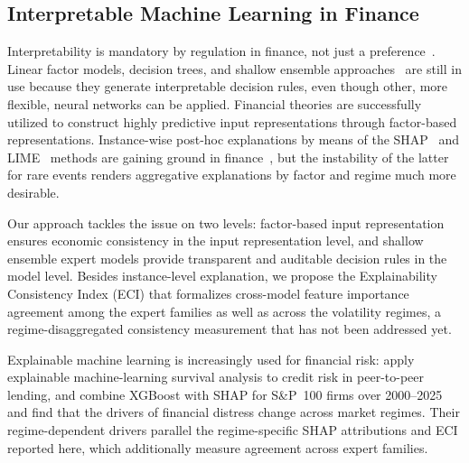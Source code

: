 \documentclass[]{interact}
\begin{document}
\subsection{Interpretable Machine Learning in Finance}
\label{subsec:rel_interpretable}

Interpretability is mandatory by regulation in finance, not just a
preference~\citep{arrieta2020explainable}. Linear factor models, decision trees, and
shallow ensemble approaches~\citep{breiman2001random, friedman2001greedy} are still in use because
they generate interpretable decision rules, even though other,
more flexible, neural networks can be applied. Financial theories
are successfully utilized to construct highly predictive input representations through factor-based representations. Instance-wise post-hoc explanations by means of the SHAP~\citep{lundberg2017shap}
and LIME~\citep{ribeiro2016lime} methods are gaining ground in finance~\citep{wang2024adapt},
but the instability of the latter for rare events renders aggregative explanations by factor and regime much more desirable.

Our approach tackles the issue on two levels: factor-based
input representation ensures economic consistency in the input
representation level, and shallow ensemble expert models provide transparent and auditable decision rules in the model
level. Besides instance-level explanation, we propose the
Explainability Consistency Index (ECI) that formalizes cross-model
feature importance agreement among the expert families as well as across the volatility regimes, a regime-disaggregated
consistency measurement that has not been addressed yet.

Explainable machine learning is increasingly used for financial risk: \citet{bonewinkel2024credit} apply explainable machine-learning survival analysis to credit risk in peer-to-peer lending, and \citet{tabatabaei2026xai} combine XGBoost with SHAP for S\&P~100 firms over 2000--2025 and find that the drivers of financial distress change across market regimes. Their regime-dependent drivers parallel the regime-specific SHAP attributions and ECI reported here, which additionally measure agreement across expert families.
\end{document}
